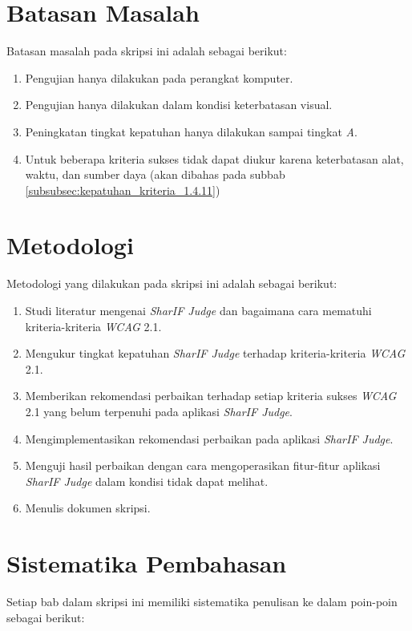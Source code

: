 \section{Batasan Masalah}
\label{sec:batasan}
Batasan masalah pada skripsi ini adalah sebagai berikut:

\begin{enumerate}
	\item Pengujian hanya dilakukan pada perangkat komputer.
	\item Pengujian hanya dilakukan dalam kondisi keterbatasan visual.
	\item Peningkatan tingkat kepatuhan hanya dilakukan sampai tingkat \textit{A}.
	\item Untuk beberapa kriteria sukses tidak dapat diukur karena keterbatasan alat, waktu, dan sumber daya (akan dibahas pada subbab \ref{subsubsec:kepatuhan_kriteria_1.4.11})
\end{enumerate}

\section{Metodologi}
\label{sec:metlit}
Metodologi yang dilakukan pada skripsi ini adalah sebagai berikut:

\begin{enumerate}
	\item Studi literatur mengenai \textit{SharIF Judge} dan bagaimana cara mematuhi kriteria-kriteria \textit{WCAG} 2.1.
	\item Mengukur tingkat kepatuhan \textit{SharIF Judge} terhadap kriteria-kriteria \textit{WCAG} 2.1.
	\item Memberikan rekomendasi perbaikan terhadap setiap kriteria sukses \textit{WCAG} 2.1 yang belum terpenuhi pada aplikasi \textit{SharIF Judge}.
	\item Mengimplementasikan rekomendasi perbaikan pada aplikasi \textit{SharIF Judge}.
	\item Menguji hasil perbaikan dengan cara mengoperasikan fitur-fitur aplikasi \textit{SharIF Judge} dalam kondisi tidak dapat melihat.
	\item Menulis dokumen skripsi.
\end{enumerate}

\section{Sistematika Pembahasan}
\label{sec:sispem}
Setiap bab dalam skripsi ini memiliki sistematika penulisan ke dalam poin-poin sebagai berikut:


